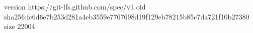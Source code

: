 version https://git-lfs.github.com/spec/v1
oid sha256:fc6d6e7b253d281a4eb3559e7767698d19f129eb78215b85c7da721f10b27380
size 22004
